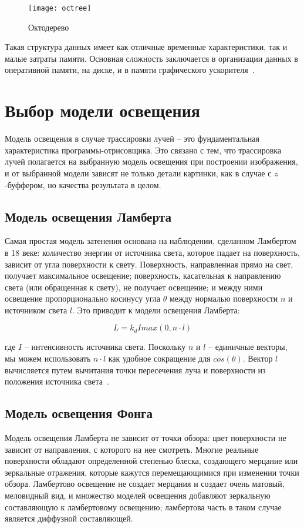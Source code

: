 \begin{figure}[htbp]
  \centering
  \texttt{[image: octree]}
  \caption{Октодерево}
\end{figure}

Такая структура данных имеет как отличные временные характеристики, так и малые затраты памяти.
Основная сложность заключается в организации данных в оперативной памяти, на диске, 
и в памяти графического ускорителя~\cite{ESVOAEaI}.

\section{Выбор модели освещения}

Модель освещения в случае трассировки лучей -- это фундаментальная характеристика программы-отрисовщика. Это связано с тем, что трассировка лучей полагается на выбранную модель освещения
при построении изображения, и от выбранной модели зависят не только детали картинки, как в случае с $z$-буффером, но качества результата в целом.

\subsection{Модель освещения Ламберта}
Самая простая модель затенения основана на наблюдении, сделанном Ламбертом в 18 веке: 
количество энергии от источника света, которое падает на поверхность, зависит от угла 
поверхности к свету. Поверхность, направленная прямо на свет, получает максимальное 
освещение; поверхность, касательная к направлению света (или обращенная к свету), 
не получает освещение; и между ними освещение пропорционально косинусу угла $\theta$
между нормалью поверхности $n$ и источником света $l$. Это приводит к 
модели освещения Ламберта:

\begin{equation}
L = k_d I max(0, n \cdot l)
\end{equation}

где $I$ -- интенсивность источника света. Поскольку $n$ и $l$ -- единичные векторы, мы можем использовать $n \cdot l$ как удобное сокращение для $cos(\theta)$. 
Вектор $l$ вычисляется путем вычитания точки пересечения луча и поверхности из положения 
источника света~\cite{FoCG}.

\subsection{Модель освещения Фонга}
Модель освещения Ламберта не зависит от точки обзора: цвет поверхности не 
зависит от направления, с которого на нее смотреть. Многие реальные поверхности 
обладают определенной степенью блеска, создающего мерцание или зеркальные отражения, 
которые кажутся перемещающимися при изменении точки обзора. 
Ламбертово освещение не создает мерцания и создает очень матовый, 
меловидный вид, и множество моделей освещения добавляют зеркальную 
составляющую к ламбертовому освещению; ламбертова часть в таком случае 
является диффузной составляющей. 

